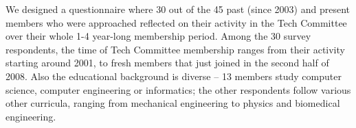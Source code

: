 \documentclass{chi2009}
\begin{document}
We designed a questionnaire where 30 out of the 45 past (since 2003) and present members who were approached reflected on their activity in the Tech Committee over their whole 1-4 year-long membership period. %
Among the 30 survey respondents, the 
time of Tech Committee membership ranges from their activity starting around 2001, to fresh members that just joined in the second half of 2008. Also the educational background is diverse -- 13 members study computer science, computer engineering or informatics; the other respondents follow various other curricula, ranging from mechanical engineering to physics and biomedical engineering.  %




%
%

\end{document}
